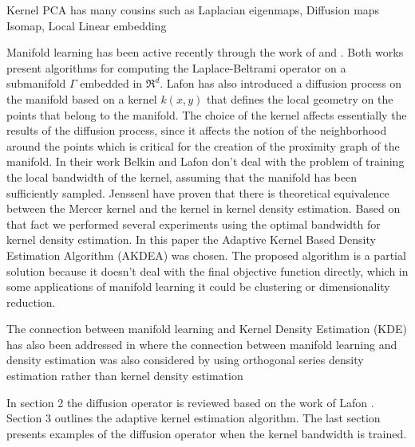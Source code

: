 \documentclass[12pt,letterpaper,doublespaced,ETD,dvips,proposal]{gtthesis}
\begin{document}
\begin{Body}
Kernel PCA has many cousins such as Laplacian eigenmaps, Diffusion
maps Isomap, Local Linear embedding

Manifold learning has been active recently through the work of
\cite{Lafon} and \cite{Belkin}. Both works present algorithms for
computing the Laplace-Beltrami operator on a submanifold $\Gamma$
embedded in $\Re^d$. Lafon has also introduced a diffusion process
on the manifold based on a kernel $k(x,y)$ that defines the local
geometry on the points that belong to the manifold. The choice of
the kernel affects essentially the results of the diffusion process,
since it affects the notion of the neighborhood around the points
which is critical for the creation of the proximity graph of the
manifold. In their work Belkin and Lafon don't deal with the problem
of training the local bandwidth of the kernel, assuming that the
manifold has been sufficiently sampled. Jenssenl \cite{jenssen17lpd}
have proven  that there is theoretical equivalence between the
Mercer kernel and the kernel in kernel density estimation. Based on
that fact we performed several experiments using the optimal
bandwidth for kernel density estimation. In this paper the Adaptive
Kernel Based Density Estimation Algorithm (AKDEA) \cite{Silverman}
was chosen. The proposed algorithm is a partial solution because it
doesn't deal with the final objective function directly, which in
some applications of manifold learning it could be clustering or
dimensionality reduction.

 The connection between manifold learning and Kernel Density Estimation (KDE) has also been addressed
in \cite{girolami2002osd} where the connection between manifold
learning and density estimation was also considered by using
orthogonal series density estimation rather than kernel density
estimation

In  section 2 the diffusion operator is reviewed based on the work
of Lafon \cite{Lafon}. Section 3 outlines the adaptive kernel
estimation algorithm. The last section presents examples of the
diffusion operator when the kernel bandwidth is trained.


\end{Body}
\end{document}
